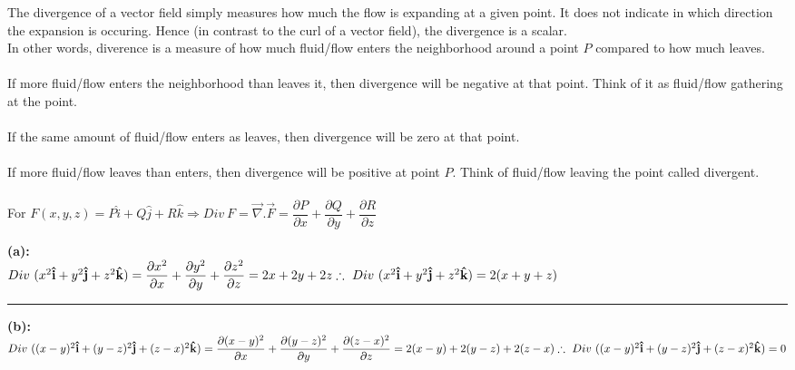 \documentclass[fleqn]{article}
\begin{document}
\begin{enumerate}
      \textcolor{hwColor}{
        The divergence of a vector field simply measures how much the flow is expanding at a given point. It does not indicate in which direction the expansion is occuring. 
        Hence (in contrast to the curl of a vector field), the divergence is a scalar. \\
        In other words, diverence is a measure of how much fluid/flow enters the neighborhood around a point 
        $P$ compared to how much leaves. \\ \\
        If more fluid/flow enters the neighborhood than leaves it, 
        then divergence will be negative at that point. Think of it as fluid/flow gathering at the point. \\ \\
        If the same amount of fluid/flow enters as leaves, then divergence will be zero at that point. \\ \\
        If more fluid/flow leaves than enters, then divergence will be positive at point $P$. Think of 
        fluid/flow leaving the point called divergent. \\ \\
        For $F(x,y,z)=P \hat{i}+Q\hat{j}+R\hat{k} \Rightarrow Div ~ F=\overrightarrow{\nabla}.\overrightarrow{F}=\dfrac{\partial P}{\partial x}+\dfrac{\partial Q}{\partial y}+\dfrac{\partial R}{\partial z}$
      }

      \textcolor{hwColor}{
        \textbf{(a):} \\
        $
          Div ~ (x^2 \mathbf{\hat{i}}+y^2 \mathbf{\hat{j}}+z^2 \mathbf{\hat{k}})=\dfrac{\partial x^2}{\partial x}+\dfrac{\partial y^2}{\partial y}+\dfrac{\partial z^2}{\partial z}=2x+2y+2z \\
          \\
          \therefore ~ Div ~ (x^2 \mathbf{\hat{i}}+y^2 \mathbf{\hat{j}}+z^2 \mathbf{\hat{k}})=2(x+y+z) \\ \\
        $
      }

      \rule{15cm}{1pt}

      \textcolor{hwColor}{
        \textbf{(b):} \\
        $
          Div ~ ((x-y)^2 \mathbf{\hat{i}}+(y-z)^2 \mathbf{\hat{j}}+(z-x)^2 \mathbf{\hat{k}}) \\ \\
          =\dfrac{\partial (x-y)^2}{\partial x}+\dfrac{\partial (y-z)^2}{\partial y}+\dfrac{\partial (z-x)^2}{\partial z}=2(x-y)+2(y-z)+2(z-x) \\
          \\
          \therefore ~ Div ~ ((x-y)^2 \mathbf{\hat{i}}+(y-z)^2 \mathbf{\hat{j}}+(z-x)^2 \mathbf{\hat{k}})=0 \\
        $
      }


\end{enumerate}
\end{document}
